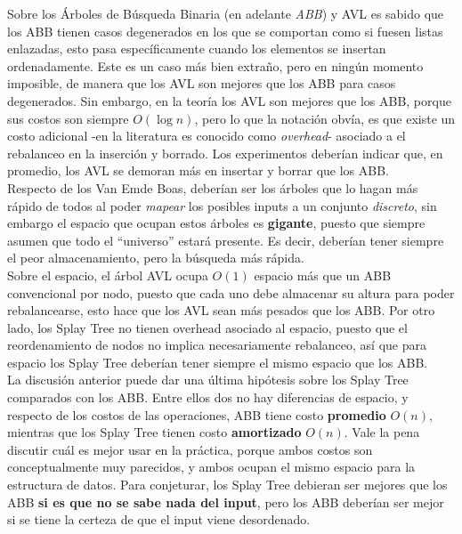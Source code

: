 \documentclass[12pt,letterpaper]{report}
\begin{document}
Sobre los Árboles de Búsqueda Binaria (en adelante \emph{ABB}) y AVL es sabido que los ABB tienen casos degenerados en los que se comportan como si fuesen listas enlazadas, esto pasa específicamente cuando los elementos se insertan ordenadamente. Este es un caso más bien extraño, pero en ningún momento imposible, de manera que los AVL son mejores que los ABB para casos degenerados. Sin embargo, en la teoría los AVL son mejores que los ABB, porque sus costos son siempre $O(\log n)$, pero lo que la notación obvía, es que existe un costo adicional -en la literatura es conocido como \emph{overhead}- asociado a el rebalanceo en la inserción y borrado. Los experimentos deberían indicar que, en promedio, los AVL se demoran más en insertar y borrar que los ABB.\\

Respecto de los Van Emde Boas, deberían ser los árboles que lo hagan más rápido de todos al poder \emph{mapear} los posibles inputs a un conjunto \emph{discreto}, sin embargo el espacio que ocupan estos árboles es \textbf{gigante}, puesto que siempre asumen que todo el ``universo'' estará presente. Es decir, deberían tener siempre el peor almacenamiento, pero la búsqueda más rápida.\\

Sobre el espacio, el árbol AVL ocupa $O(1)$ espacio más que un ABB convencional por nodo, puesto que cada uno debe almacenar su altura para poder rebalancearse, esto hace que los AVL sean más pesados que los ABB. Por otro lado, los Splay Tree no tienen overhead asociado al espacio, puesto que el reordenamiento de nodos no implica necesariamente rebalanceo, así que para espacio los Splay Tree deberían tener siempre el mismo espacio que los ABB.\\

La discusión anterior puede dar una última hipótesis sobre los Splay Tree comparados con los ABB. Entre ellos dos no hay diferencias de espacio, y respecto de los costos de las operaciones, ABB tiene costo \textbf{promedio} $O(n)$, mientras que los Splay Tree tienen costo \textbf{amortizado} $O(n)$. Vale la pena discutir cuál es mejor usar en la práctica, porque ambos costos son conceptualmente muy parecidos, y ambos ocupan el mismo espacio para la estructura de datos. Para conjeturar, los Splay Tree debieran ser mejores que los ABB \textbf{si es que no se sabe nada del input}, pero los ABB deberían ser mejor si se tiene la certeza de que el input viene desordenado.\\
\end{document}
